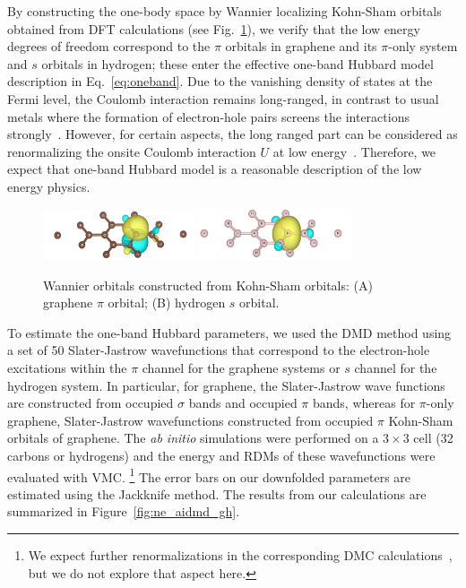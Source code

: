 By constructing the one-body space by Wannier localizing Kohn-Sham orbitals obtained from DFT calculations (see Fig.~\ref{fig:honeycomb_wan}), 
we verify that the low energy degrees of freedom correspond to the $\pi$ orbitals in graphene and 
its $\pi$-only system and $s$ orbitals in hydrogen; these enter the effective one-band Hubbard model description in Eq.~\eqref{eq:oneband}. 
Due to the vanishing density of states at the Fermi level, the Coulomb interaction remains long-ranged, 
in contrast to usual metals where the formation of electron-hole pairs screens the interactions strongly~\cite{Zheng2016}. 
However, for certain aspects, the long ranged part can be considered as renormalizing the 
onsite Coulomb interaction $U$ at low energy~\cite{Schuler2013, Changlani2015}. 
Therefore, we expect that one-band Hubbard model is a reasonable description of the low energy physics. 
\begin{figure}[hbt]
\centering
\includegraphics[width=0.40\textwidth]{./Figures/c_pi.eps}
\includegraphics[width=0.40\textwidth]{./Figures/h_wan.eps}
\caption{Wannier orbitals constructed from Kohn-Sham orbitals: (A) graphene $\pi$ orbital; (B) hydrogen $s$ orbital. }
\label{fig:honeycomb_wan}
\end{figure}

To estimate the one-band Hubbard parameters, we used the DMD method using a set of 50 Slater-Jastrow wavefunctions that correspond 
to the electron-hole excitations within the $\pi$ channel for the graphene systems 
or $s$ channel for the hydrogen system. In particular, for graphene, 
the Slater-Jastrow wave functions are constructed from occupied $\sigma$ bands and occupied $\pi$ bands, whereas for $\pi$-only 
graphene, Slater-Jastrow wavefunctions constructed from occupied $\pi$ Kohn-Sham orbitals of graphene. The \textit{ab initio} simulations 
were performed on a $3\times3$ cell (32 carbons or hydrogens) and the energy and RDMs of these wavefunctions were
evaluated with VMC. \footnote{We expect further renormalizations in the corresponding DMC calculations~\cite{Changlani2015}, 
but we do not explore that aspect here.} The error bars on our downfolded parameters are estimated using the Jackknife method. 
The results from our calculations are summarized in %
Figure~\ref{fig:ne_aidmd_gh}.%

